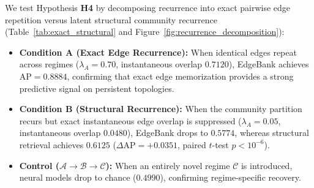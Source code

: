 \documentclass[10pt,twocolumn,letterpaper]{article}
\begin{document}
\begin{table}[!htbp]
\centering
\small
\caption{\textbf{Recurrence Decomposition: Exact vs. Structural Signal ($T_B=100$).}}
\label{tab:exact_structural}
\vspace{2pt}
\end{table}

We test Hypothesis \textbf{H4} by decomposing recurrence into exact pairwise edge repetition versus latent structural community recurrence (Table~\ref{tab:exact_structural} and Figure~\ref{fig:recurrence_decomposition}):
\begin{itemize}
    \item \textbf{Condition A (Exact Edge Recurrence):} When identical edges repeat across regimes ($\lambda_A = 0.70$, instantaneous overlap $0.7120$), EdgeBank achieves $\text{AP} = 0.8884$, confirming that exact edge memorization provides a strong predictive signal on persistent topologies.
    \item \textbf{Condition B (Structural Recurrence):} When the community partition recurs but exact instantaneous edge overlap is suppressed ($\lambda_A = 0.05$, instantaneous overlap $0.0480$), EdgeBank drops to $0.5774$, whereas structural retrieval achieves $0.6125$ ($\Delta\text{AP} = +0.0351$, paired $t$-test $p < 10^{-6}$).
    \item \textbf{Control ($\mathcal{A} \to \mathcal{B} \to \mathcal{C}$):} When an entirely novel regime $\mathcal{C}$ is introduced, neural models drop to chance ($0.4990$), confirming regime-specific recovery.
\end{itemize}
\end{document}
